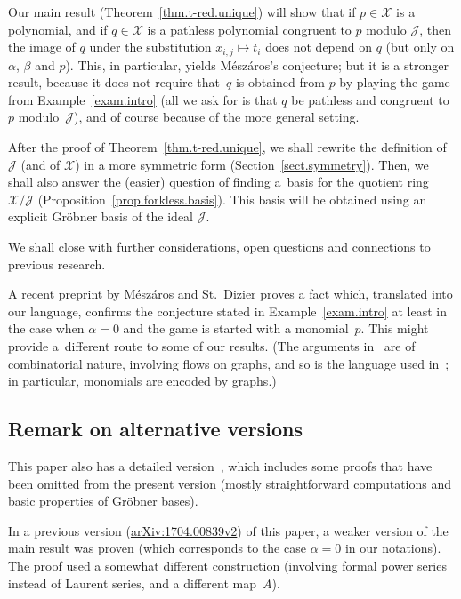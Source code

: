 \documentclass[pdftex]{sigma}
\numberwithin{equation}{section}
\begin{document}
Our main result (Theorem~\ref{thm.t-red.unique}) will show that if $p\in\mathcal{X}$ is a polynomial, and if $q\in\mathcal{X}$ is a pathless polynomial congruent to $p$ modulo $\mathcal{J}$, then the image of $q$ under
the substitution $x_{i,j}\mapsto t_{i}$ does not depend on $q$ (but only on $\alpha$, $\beta$ and $p$). This, in particular, yields M\'{e}sz\'{a}ros's conjecture; but it is a stronger result, because it does not require that~$q$ is obtained from $p$ by playing the game from Example~\ref{exam.intro} (all we ask for is that $q$ be pathless and congruent to~$p$ modulo~$\mathcal{J}$), and of course because of the more general setting.

After the proof of Theorem~\ref{thm.t-red.unique}, we shall rewrite the definition of $\mathcal{J}$ (and of $\mathcal{X}$) in a more symmetric form (Section~\ref{sect.symmetry}). Then, we shall also answer the (easier)
question of finding a~basis for the quotient ring $\mathcal{X}/\mathcal{J}$ (Proposition~\ref{prop.forkless.basis}). This basis will be obtained using an explicit Gr\"{o}bner basis of the ideal $\mathcal{J}$.

We shall close with further considerations, open questions and connections to previous research.

A recent preprint by M\'{e}sz\'{a}ros and St.~Dizier \cite{MesDiz17} proves a fact \cite[Theorem~A]{MesDiz17} which, translated into our language, confirms the conjecture stated in Example~\ref{exam.intro} at least in the case when $\alpha=0$ and the game is started with a monomial~$p$. This might provide a~different route to some of our results. (The arguments in~\cite{MesDiz17} are of combinatorial nature, involving flows on graphs, and so is the language used in~\cite{MesDiz17}; in particular, monomials are encoded by graphs.)

\subsection{Remark on alternative versions}

This paper also has a detailed version~\cite{verlong}, which includes some proofs that have been omitted from the present version (mostly straightforward computations and basic properties of Gr\"{o}bner bases).

In a previous version (\href{https://arxiv.org/abs/1704.00839v2}{arXiv:1704.00839v2}) of this paper, a weaker version of the main result was proven (which corresponds to the case $\alpha=0$ in our notations). The proof used a somewhat different construction (involving formal power series instead of Laurent series, and a different map~$A$).
\end{document}
